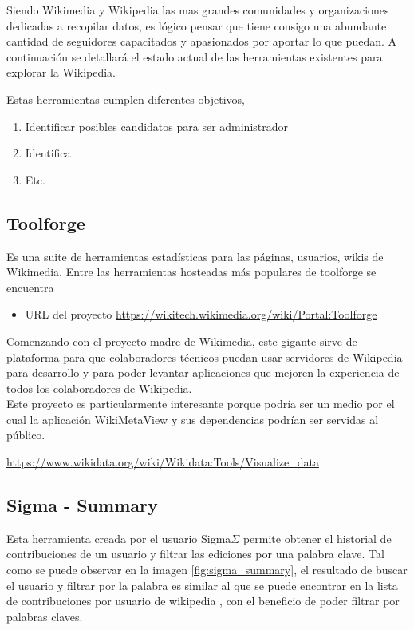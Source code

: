 Siendo Wikimedia y Wikipedia las mas grandes comunidades y organizaciones dedicadas a recopilar datos, es lógico pensar que tiene consigo una abundante cantidad de seguidores capacitados y apasionados por aportar lo que puedan. A continuación se detallará el estado actual de las herramientas existentes para explorar la Wikipedia.

Estas herramientas cumplen diferentes objetivos,

\begin{enumerate}
    \item Identificar posibles candidatos para ser administrador
    \item Identifica
    \item Etc.
\end{enumerate}


\subsection{Toolforge}

Es una suite de herramientas estadísticas para las páginas, usuarios, wikis de Wikimedia. Entre las herramientas hosteadas más populares de toolforge se encuentra 

\begin{itemize}
    \item URL del proyecto \url{https://wikitech.wikimedia.org/wiki/Portal:Toolforge}
\end{itemize}

Comenzando con el proyecto madre de Wikimedia, este gigante sirve de plataforma para que colaboradores técnicos puedan usar servidores de Wikipedia para desarrollo y para poder levantar aplicaciones que mejoren la experiencia de todos los colaboradores de Wikipedia.
\\
Este proyecto es particularmente interesante porque podría ser un medio por el cual la aplicación WikiMetaView y sus dependencias podrían ser servidas al público.

\url{https://www.wikidata.org/wiki/Wikidata:Tools/Visualize_data}

\subsection{Sigma - Summary}

Esta herramienta creada por el usuario Sigma\(\Sigma\) permite obtener el historial de contribuciones de un usuario y filtrar las ediciones por una palabra clave. Tal como se puede observar en la imagen \ref{fig:sigma_summary}, el resultado de buscar el usuario  y filtrar por la palabra  es similar al que se puede encontrar en la lista de contribuciones por usuario de wikipedia \cite{UserClarityfiend}, con el beneficio de poder filtrar por palabras claves.


